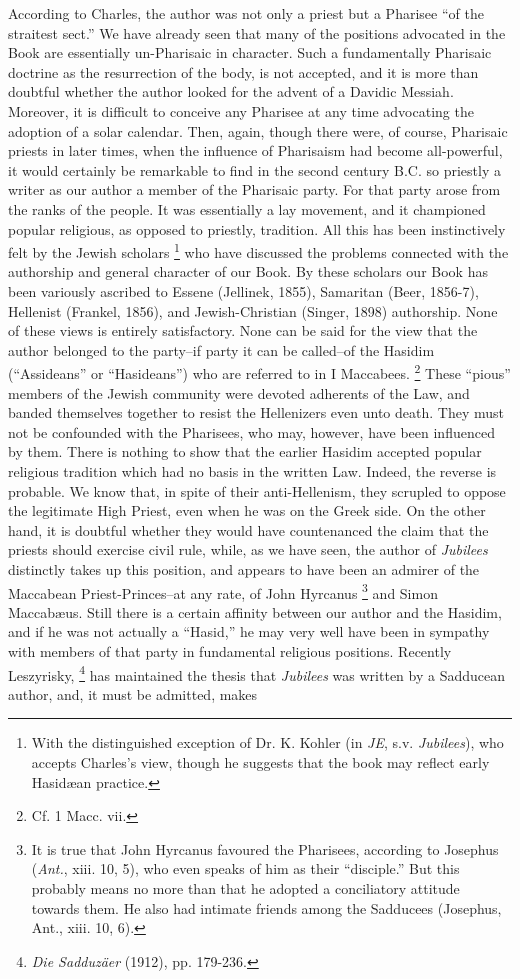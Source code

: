 According to Charles, the author was not only a priest but a Pharisee ``of the straitest sect.'' We have already seen that many of the positions advocated in the Book are essentially un-Pharisaic in character. Such a fundamentally Pharisaic doctrine as the resurrection of the body, is not accepted, and it is more than doubtful whether the author looked for the advent of a Davidic Messiah. Moreover, it is difficult to conceive any Pharisee at any time advocating the adoption of a solar calendar. Then, again, though there were, of course, Pharisaic priests in later times, when the influence of Pharisaism had become all-powerful, it would certainly be remarkable to find in the second century B.C. so priestly a writer as our author a member of the Pharisaic party. For that party arose from the ranks of the people. It was essentially a lay movement, and it championed popular religious, as opposed to priestly, tradition. All this has been instinctively felt by the Jewish scholars \footnote{With the distinguished exception of Dr. K. Kohler (in \emph{JE}, s.v. \emph{Jubilees}), who accepts Charles's view, though he suggests that the book may reflect early Hasidæan practice.} who have discussed the problems connected with the authorship and general character of our Book. By these scholars our Book has been variously ascribed to Essene (Jellinek, 1855), Samaritan (Beer, 1856-7), Hellenist (Frankel, 1856), and Jewish-Christian (Singer, 1898) authorship. None of these views is entirely satisfactory. None can be said for the view that the author belonged to the party--if party it can be called--of the Hasidim (``Assideans'' or ``Hasideans'') who are referred to in I Maccabees. \footnote{Cf. 1 Macc. vii.} These ``pious'' members of the Jewish community were devoted adherents of the Law, and banded themselves together to resist the Hellenizers even unto death. They must not be confounded with the Pharisees, who may, however, have been influenced by them. There is nothing to show that the earlier Hasidim accepted popular religious tradition which had no basis in the written Law. Indeed, the reverse is probable. We know that, in spite of their anti-Hellenism, they scrupled to oppose the legitimate High Priest, even when he was on the Greek side. On the other hand, it is doubtful whether they would have countenanced the claim that the priests should exercise civil rule, while, as we have seen, the author of \emph{Jubilees} distinctly takes up this position, and appears to have been an admirer of the Maccabean Priest-Princes--at any rate, of John Hyrcanus \footnote{It is true that John Hyrcanus favoured the Pharisees, according to Josephus (\emph{Ant.}, xiii. 10, 5), who even speaks of him as their ``disciple.'' But this probably means no more than that he adopted a conciliatory attitude towards them. He also had intimate friends among the Sadducees (Josephus, Ant., xiii. 10, 6).} and Simon Maccabæus. Still there is a certain affinity between our author and the Hasidim, and if he was not actually a ``Hasid,'' he may very well have been in sympathy with members of that party in fundamental religious positions. Recently Leszyrisky, \footnote{\emph{Die Sadduzäer} (1912), pp. 179-236.} has maintained the thesis that \emph{Jubilees} was written by a Sadducean author, and, it must be admitted, makes 